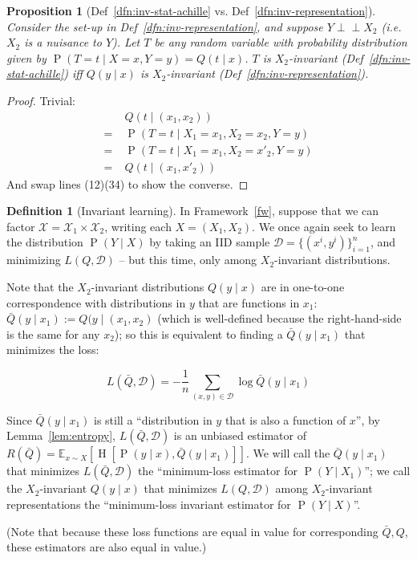 \documentclass[12pt]{article}
\newcommand{\ci}{\perp\!\!\!\perp}
\newcommand{\Ent}[1]{\operatorname{H}\left[#1\right]}
\newcommand{\E}[2][{}]{\mathbb{E}_{#1}\left[#2\right]}
\newcommand{\Prob}[1]{\operatorname{P}\left(#1\right)}
\newtheorem{prop}[thm]{Proposition}
\theoremstyle{definition}
\newtheorem{dfn}[thm]{Definition}
\numberwithin{equation}{section}
\numberwithin{figure}{section}
\numberwithin{table}{section}
\begin{document}
\begin{prop}[Def~\ref{dfn:inv-stat-achille} vs. Def~\ref{dfn:inv-representation}]
    \label{prop:inv-stat-achille}
    Consider the set-up in Def~\ref{dfn:inv-representation}, and suppose $Y\ci X_2$ (i.e. $X_2$ is a nuisance to $Y$). Let $T$ be any random variable with probability distribution given by $\Prob{T=t\mid X=x, Y=y}=Q(t\mid x)$. $T$ is $X_2$-invariant (Def~\ref{dfn:inv-stat-achille}) iff $Q(y\mid x)$ is $X_2$-invariant (Def~\ref{dfn:inv-representation}).
\end{prop}
\begin{proof}
    Trivial: 
    \begin{align*}
        & Q(t\mid (x_1, x_2)) \\ 
        =\; & \Prob{T=t\mid X_1 = x_1, X_2 = x_2, Y= y} \\
        =\; & \Prob{T=t\mid X_1 = x_1, X_2 = x'_2, Y= y} \\
        =\; & Q(t\mid (x_1, x'_2))
    \end{align*}
    And swap lines (12)(34) to show the converse.
\end{proof}

\begin{dfn}[Invariant learning]
    \label{dfn:inv-learning}
    In Framework~\ref{fw}, suppose that we can factor $\mathcal{X}=\mathcal{X}_1\times\mathcal{X}_2$, writing each $X=(X_1, X_2)$. We once again seek to learn the distribution $\Prob{Y\mid X}$ by taking an IID sample $\mathcal{D}=\{(x^i,y^i)\}_{i=1}^n$, and minimizing $L(Q,\mathcal{D})$ -- but this time, only among $X_2$-invariant distributions. 
    
    Note that the $X_2$-invariant distributions $Q(y\mid x)$ are in one-to-one correspondence with distributions in $y$ that are functions in $x_1$: $\bar{Q}(y\mid x_1):=Q(y\mid(x_1, x_2)$ (which is well-defined because the right-hand-side is the same for any $x_2$); so this is equivalent to finding a $\bar{Q}(y\mid x_1)$ that minimizes the loss: 
    
    \begin{equation*}
        L(\bar{Q},\mathcal{D}) = -\frac1n \sum_{(x,y)\in\mathcal{D}}{\log \bar{Q}(y\mid x_1)}
    \end{equation*}
    
    Since $\bar{Q}(y\mid x_1)$ is still a ``distribution in $y$ that is also a function of $x$'', by Lemma~\ref{lem:entropy}, $L(\bar{Q},\mathcal{D})$ is an unbiased estimator of $R(\bar{Q})=\E[x\sim X]{\Ent{\Prob{y\mid x}, \bar{Q}(y\mid x_1)}}$. We will call the $\bar{Q}(y\mid x_1)$ that minimizes $L(\bar{Q},\mathcal{D})$ the ``minimum-loss estimator for $\Prob{Y\mid X_1}$''; we call the $X_2$-invariant $Q(y\mid x)$ that minimizes $L(Q,\mathcal{D})$ among $X_2$-invariant representations the ``minimum-loss invariant estimator for $\Prob{Y\mid X}$''.
    
    (Note that because these loss functions are equal in value for corresponding $\bar{Q},Q$, these estimators are also equal in value.)
\end{dfn}
\end{document}
